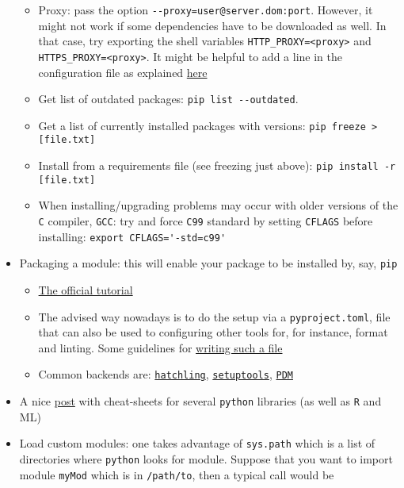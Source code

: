 \documentclass[a4paper,12pt,%
              final%
              ]{article}
\begin{document}
\begin{itemize}
\begin{itemize}
      \item Proxy: pass the option \verb|--proxy=user@server.dom:port|. However, it might not work if some dependencies have to be downloaded as well. In that case, try exporting the shell variables \verb|HTTP_PROXY=<proxy>| and \verb|HTTPS_PROXY=<proxy>|. It might be helpful to add a line in the configuration file as explained \href{https://stackoverflow.com/questions/43473041/how-to-configure-pip-per-config-file-to-use-a-proxy-with-authentification}{here}
      \item Get list of outdated packages: \verb|pip list --outdated|.
      \item Get a list of currently installed packages with versions: \verb|pip freeze > [file.txt]|
      \item Install from a requirements file (see freezing just above): \verb|pip install -r [file.txt]|
      \item When installing/upgrading problems may occur with older versions of the \texttt{C} compiler, \texttt{GCC}: try and force \texttt{C99} standard by setting \texttt{CFLAGS} before installing: \verb|export CFLAGS='-std=c99'|
    \end{itemize}
  \item Packaging a module: this will enable your package to be installed by, say, \texttt{pip}
    \begin{itemize}
      \item \href{https://packaging.python.org/en/latest/tutorials/packaging-projects/}{The official tutorial}
      \item The advised way nowadays is to do the setup via a \texttt{pyproject.toml}, file that can also be used to configuring other tools for, for instance, format and linting. Some guidelines for \href{https://packaging.python.org/en/latest/guides/writing-pyproject-toml}{writing such a file}
      \item Common backends are: \href{https://hatch.pypa.io/dev/why/#build-backend}{\texttt{hatchling}}, \href{https://setuptools.pypa.io/en/latest/index.html}{\texttt{setuptools}}, \href{https://pdm-project.org/en/latest/}{\texttt{PDM}}
    \end{itemize}
  \item A nice \href{https://medium.com/@anushkhabajpai/top-data-science-cheat-sheets-ml-dl-python-r-sql-maths-statistics-5239d4568225}{post} with cheat-sheets for several \texttt{python} libraries (as well as \texttt{R} and ML)
  \item Load custom modules: one takes advantage of \verb|sys.path| which is a list of directories where \texttt{python} looks for module. Suppose that you want to import module \texttt{myMod} which is in \texttt{/path/to}, then a typical call would be

\end{itemize}
\end{document}

